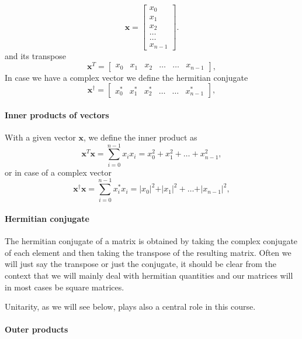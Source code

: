\[
\bm{x} = \begin{bmatrix} x_0\\ x_1 \\ x_2 \\ \dots \\ \dots \\ x_{n-1} \end{bmatrix}.
\]
and its transpose 
\[
\bm{x}^{T} = \begin{bmatrix} x_0 & x_1 & x_2 & \dots & \dots & x_{n-1} \end{bmatrix},
\]
In case we have a complex vector we define the hermitian conjugate
\[
\bm{x}^{\dagger} = \begin{bmatrix} x_0^* & x_1^* & x_2^* & \dots & \dots & x_{n-1}^* \end{bmatrix},
\]


\paragraph{Inner products of vectors}

With a given vector $\bm{x}$, we define the inner product as
\[
\bm{x}^T \bm{x} = \sum_{i=0}^{n-1} x_ix_i=x_0^2+x_1^2+\dots + x_{n-1}^2,
\]
or in case of a complex vector
\[
\bm{x}^{\dagger} \bm{x} = \sum_{i=0}^{n-1} x_i^*x_i=\vert x_0\vert^2+\vert x_1\vert^2+\dots + \vert x_{n-1}\vert^2,
\]


\paragraph{Hermitian conjugate}

The hermitian conjugate of a matrix is obtained by taking the complex
conjugate of each element and then taking the transpose of the
resulting matrix. Often we will just say the transpose or just the
conjugate, it should be clear from the context that we will mainly
deal with hermitian quantities and our matrices will in most cases be square matrices.

Unitarity, as we will see below, plays also a central role in this course.


\paragraph{Outer products}

